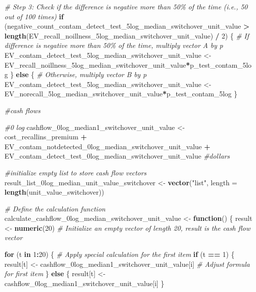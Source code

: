 \documentclass[
]{article}
\newenvironment{Shaded}{\begin{snugshade}}{\end{snugshade}}
\newcommand{\AttributeTok}[1]{\textcolor[rgb]{0.13,0.29,0.53}{#1}}
\newcommand{\CommentTok}[1]{\textcolor[rgb]{0.56,0.35,0.01}{\textit{#1}}}
\newcommand{\ControlFlowTok}[1]{\textcolor[rgb]{0.13,0.29,0.53}{\textbf{#1}}}
\newcommand{\DecValTok}[1]{\textcolor[rgb]{0.00,0.00,0.81}{#1}}
\newcommand{\FunctionTok}[1]{\textcolor[rgb]{0.13,0.29,0.53}{\textbf{#1}}}
\newcommand{\NormalTok}[1]{#1}
\newcommand{\OtherTok}[1]{\textcolor[rgb]{0.56,0.35,0.01}{#1}}
\newcommand{\SpecialCharTok}[1]{\textcolor[rgb]{0.81,0.36,0.00}{\textbf{#1}}}
\newcommand{\StringTok}[1]{\textcolor[rgb]{0.31,0.60,0.02}{#1}}
\begin{document}
\begin{Shaded}
\begin{Highlighting}[]
\CommentTok{\# Step 3: Check if the difference is negative more than 50\% of the time (i.e., 50 out of 100 times)}
\ControlFlowTok{if}\NormalTok{ (negative\_count\_contam\_detect\_test\_5log\_median\_switchover\_unit\_value }\SpecialCharTok{\textgreater{}} \FunctionTok{length}\NormalTok{(EV\_recall\_noillness\_5log\_median\_switchover\_unit\_value) }\SpecialCharTok{/} \DecValTok{2}\NormalTok{) \{}
  \CommentTok{\# If difference is negative more than 50\% of the time, multiply vector A by p}
\NormalTok{  EV\_contam\_detect\_test\_5log\_median\_switchover\_unit\_value }\OtherTok{\textless{}{-}}\NormalTok{ EV\_recall\_noillness\_5log\_median\_switchover\_unit\_value}\SpecialCharTok{*}\NormalTok{p\_test\_contam\_5log}
\NormalTok{\} }\ControlFlowTok{else}\NormalTok{ \{}
  \CommentTok{\# Otherwise, multiply vector B by p}
\NormalTok{ EV\_contam\_detect\_test\_5log\_median\_switchover\_unit\_value  }\OtherTok{\textless{}{-}}\NormalTok{ EV\_norecall\_5log\_median\_switchover\_unit\_value}\SpecialCharTok{*}\NormalTok{p\_test\_contam\_5log}
\NormalTok{\}}


\CommentTok{\#cash flows}

\CommentTok{\#0 log}
\NormalTok{cashflow\_0log\_median1\_switchover\_unit\_value }\OtherTok{\textless{}{-}}\NormalTok{ cost\_recallins\_premium }\SpecialCharTok{+}\NormalTok{ EV\_contam\_notdetected\_0log\_median\_switchover\_unit\_value }\SpecialCharTok{+}\NormalTok{ EV\_contam\_detect\_test\_0log\_median\_switchover\_unit\_value }\CommentTok{\#dollars}


\CommentTok{\#initialize empty list to store cash flow vectors}
\NormalTok{result\_list\_0log\_median\_unit\_value\_switchover }\OtherTok{\textless{}{-}} \FunctionTok{vector}\NormalTok{(}\StringTok{"list"}\NormalTok{, }\AttributeTok{length =} \FunctionTok{length}\NormalTok{(unit\_value\_switchover))}


\CommentTok{\# Define the calculation function}
\NormalTok{calculate\_cashflow\_0log\_median\_switchover\_unit\_value }\OtherTok{\textless{}{-}} \ControlFlowTok{function}\NormalTok{() \{}
\NormalTok{  result }\OtherTok{\textless{}{-}} \FunctionTok{numeric}\NormalTok{(}\DecValTok{20}\NormalTok{)  }\CommentTok{\# Initialize an empty vector of length 20, result is the cash flow vector}
  
  \ControlFlowTok{for}\NormalTok{ (t }\ControlFlowTok{in} \DecValTok{1}\SpecialCharTok{:}\DecValTok{20}\NormalTok{) \{}
    \CommentTok{\# Apply special calculation for the first item}
    \ControlFlowTok{if}\NormalTok{ (t }\SpecialCharTok{==} \DecValTok{1}\NormalTok{) \{}
\NormalTok{      result[t] }\OtherTok{\textless{}{-}}\NormalTok{ cashflow\_0log\_median1\_switchover\_unit\_value[i] }\CommentTok{\# Adjust formula for first item}
\NormalTok{    \} }\ControlFlowTok{else}\NormalTok{ \{}
\NormalTok{      result[t] }\OtherTok{\textless{}{-}}\NormalTok{ cashflow\_0log\_median1\_switchover\_unit\_value[i]}
\NormalTok{    \}}
    

\end{Highlighting}
\end{Shaded}
\end{document}
